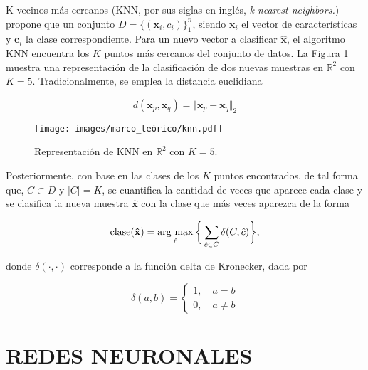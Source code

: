 K vecinos más cercanos (KNN, por sus siglas en inglés, \textit{k-nearest neighbors.}) propone que un conjunto $D = \{(\mathbf{x}_i, {c}_i)\}_1^n$, siendo $\mathbf{x}_i$ el vector de características y $\mathbf{c}_i$ la clase correspondiente. Para un nuevo vector a clasificar $\mathbf{\hat{x}}$, el algoritmo KNN encuentra los $K$ puntos más cercanos del conjunto de datos. La Figura \ref{fig:knn} muestra una representación de la clasificación de dos nuevas muestras en $\mathbb{R}^2$ con $K = 5$. Tradicionalmente, se emplea la distancia euclidiana 

\begin{equation}
    d(\mathbf{x}_p,\mathbf{x}_q) = \Vert \mathbf{x}_p-\mathbf{x}_q \Vert_2
    \label{eq:distancia_euclidiana}
\end{equation}

\begin{figure}[H]
    \centering
    \caption{\hspace{2mm}Representación de KNN en $\mathbb{R}^2$ con $K = 5$.}
    \texttt{[image: images/marco\_teórico/knn.pdf]}
    \label{fig:knn}
\end{figure}

Posteriormente, con base en las clases de los $K$ puntos encontrados, de tal forma que, $C \subset D$ y $\vert C \vert = K$, se cuantifica la cantidad de veces que aparece cada clase y se clasifica la nueva muestra $\mathbf{\hat{x}}$ con la clase que más veces aparezca de la forma

\begin{equation}
    \mathrm{clase}(\mathbf{\hat{x}}) =  \operatorname*{arg \ max}_{\hat{c}} \bigg\{ \sum_{\hat{c} \in C} \delta(C,\hat{c})\bigg\},
\end{equation}

donde $\delta(\cdot,\cdot)$ corresponde a la función delta de Kronecker, dada por

\begin{equation}
    \delta(a,b) = \begin{cases}
        1, \quad a = b \\
        0, \quad a \neq b
    \end{cases}
\end{equation}
\section{REDES NEURONALES}

